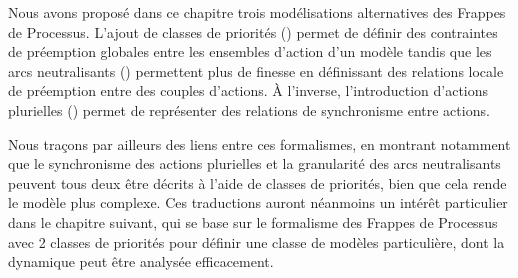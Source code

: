 Nous avons proposé dans ce chapitre trois modélisations alternatives des Frappes de Processus.
L'ajout de classes de priorités () permet de définir des contraintes
de préemption globales entre les ensembles d'action d'un modèle
tandis que les arcs neutralisants () permettent plus de finesse
en définissant des relations locale de préemption entre des couples d'actions.
À l'inverse, l'introduction d'actions plurielles () permet de représenter des relations
de synchronisme entre actions.

Nous traçons par ailleurs des liens entre ces formalismes,
en montrant notamment que le synchronisme des actions plurielles
et la granularité des arcs neutralisants
peuvent tous deux être décrits à l'aide de classes de priorités,
bien que cela rende le modèle plus complexe.
Ces traductions auront néanmoins un intérêt particulier dans le chapitre suivant,
qui se base sur le formalisme des Frappes de Processus avec 2 classes de priorités
pour définir une classe de modèles particulière,
dont la dynamique peut être analysée efficacement.

